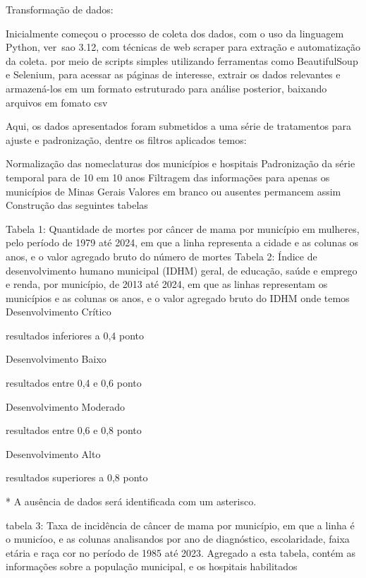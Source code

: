 Transformação de dados:

Inicialmente começou o processo de coleta dos dados, com o uso da linguagem Python, ver~sao 3.12, com técnicas de web scraper para extração e automatização da coleta. por meio de scripts simples
utilizando ferramentas como BeautifulSoup e Selenium, para acessar as páginas de interesse, extrair os dados relevantes e armazená-los em um formato estruturado para análise posterior, baixando arquivos em fomato csv

Aqui, os dados apresentados foram submetidos a uma série de tratamentos para ajuste e padronização, dentre os filtros aplicados temos:

    Normalização das nomeclaturas dos municípios e hospitais
    Padronização da série temporal para de 10 em 10 anos
    Filtragem das informações para apenas os municípios de Minas Gerais
    Valores em branco ou ausentes permancem assim
    Construção das seguintes tabelas

    Tabela 1: Quantidade de mortes por câncer de mama por município em mulheres, pelo período de 1979 até 2024, em que a linha representa a cidade e as colunas os anos, e o valor agregado bruto do número de mortes
    Tabela 2: Índice de desenvolvimento humano municipal (IDHM) geral, de educação, saúde e emprego e renda, por município, de 2013 até 2024, em que as linhas representam os municípios e as colunas os anos, e o valor agregado bruto do IDHM
   onde temos Desenvolvimento
        Crítico

        resultados
        inferiores a
        0,4 ponto

        
        Desenvolvimento
        Baixo

        resultados entre
        0,4 e 0,6 ponto

        
        Desenvolvimento
        Moderado

        resultados entre
        0,6 e 0,8 ponto

        
        Desenvolvimento
        Alto

        resultados
        superiores a
        0,8 ponto

 * A ausência de dados será identificada com um asterisco.

    tabela 3: Taxa de incidência de câncer de mama por município, em que a linha é o municíoo, e as colunas analisandos por ano de diagnóstico, escolaridade, faixa etária e raça cor no período de 1985 até 2023. Agregado a esta tabela, contém as informações sobre a população municipal, e os hospitais habilitados

